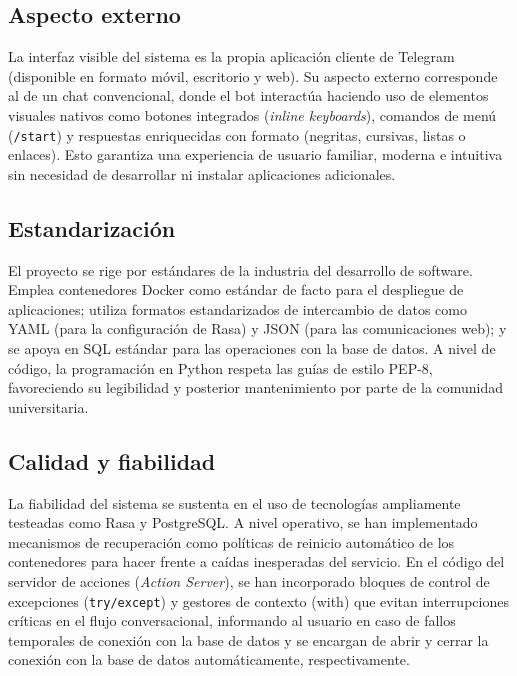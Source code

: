 \documentclass[a4paper,12pt,twoside,final]{book}
\begin{document}
\subsection{Aspecto externo}

La interfaz visible del sistema es la propia aplicación cliente de Telegram (disponible en formato móvil, escritorio y web). Su aspecto externo corresponde al de un chat convencional, donde el bot interactúa haciendo uso de elementos visuales nativos como botones integrados (\textit{inline keyboards}), comandos de menú (\texttt{/start}) y respuestas enriquecidas con formato (negritas, cursivas, listas o enlaces). Esto garantiza una experiencia de usuario familiar, moderna e intuitiva sin necesidad de desarrollar ni instalar aplicaciones adicionales.

\subsection{Estandarización}

El proyecto se rige por estándares de la industria del desarrollo de software. Emplea contenedores Docker como estándar de facto para el despliegue de aplicaciones; utiliza formatos estandarizados de intercambio de datos como YAML (para la configuración de Rasa) y JSON (para las comunicaciones web); y se apoya en SQL estándar para las operaciones con la base de datos. A nivel de código, la programación en Python respeta las guías de estilo PEP-8, favoreciendo su legibilidad y posterior mantenimiento por parte de la comunidad universitaria.

\subsection{Calidad y fiabilidad}

La fiabilidad del sistema se sustenta en el uso de tecnologías ampliamente testeadas como Rasa y PostgreSQL. A nivel operativo, se han implementado mecanismos de recuperación como políticas de reinicio automático de los contenedores para hacer frente a caídas inesperadas del servicio. En el código del servidor de acciones (\textit{Action Server}), se han incorporado bloques de control de excepciones (\texttt{try/except}) y gestores de contexto (with) que evitan interrupciones críticas en el flujo conversacional, informando al usuario en caso de fallos temporales de conexión con la base de datos y se encargan de abrir y cerrar la conexión con la base de datos automáticamente, respectivamente.
\end{document}
